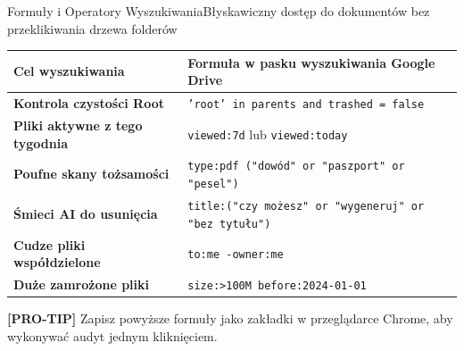 \documentclass[aspectratio=169, 10pt]{beamer}
\newcommand{\tagCard}[2]{{\setlength{\fboxsep}{2.5pt}\colorbox{brandLight}{\textcolor{brandNavy}{\sffamily\bfseries\scriptsize [#1]} \footnotesize #2}}}
\begin{document}
\begin{frame}{Formuły i Operatory Wyszukiwania}{Błyskawiczny dostęp do dokumentów bez przeklikiwania drzewa folderów}
  \begin{center}
    \small
    \begin{tabularx}{\textwidth}{p{3.8cm}X}
      \toprule
      \textbf{Cel wyszukiwania} & \textbf{Formuła w pasku wyszukiwania Google Drive} \\
      \midrule
      \textbf{Kontrola czystości Root} & \texttt{'root' in parents and trashed = false} \\
      \addlinespace
      \textbf{Pliki aktywne z tego tygodnia} & \texttt{viewed:7d} lub \texttt{viewed:today} \\
      \addlinespace
      \textbf{Poufne skany tożsamości} & \texttt{type:pdf ("dowód" or "paszport" or "pesel")} \\
      \addlinespace
      \textbf{Śmieci AI do usunięcia} & \texttt{title:("czy możesz" or "wygeneruj" or "bez tytułu")} \\
      \addlinespace
      \textbf{Cudze pliki współdzielone} & \texttt{to:me -owner:me} \\
      \addlinespace
      \textbf{Duże zamrożone pliki} & \texttt{size:>100M before:2024-01-01} \\
      \bottomrule
    \end{tabularx}
  \end{center}

  \vspace{0.3cm}
  \begin{center}
    \tagCard{PRO-TIP}{Zapisz powyższe formuły jako zakładki w przeglądarce Chrome, aby wykonywać audyt jednym kliknięciem.}
  \end{center}
\end{frame}

\end{document}
